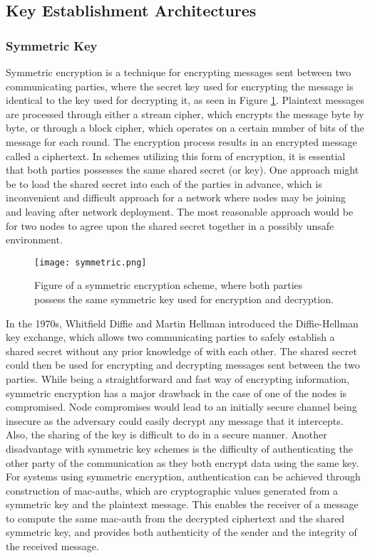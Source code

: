 \subsection{Key Establishment Architectures}

\subsubsection{Symmetric Key}

Symmetric encryption is a technique for encrypting messages sent between two communicating parties, where the secret key used for encrypting the message is identical to the key used for decrypting it, as seen in Figure \ref{fig:symmetric}. Plaintext messages are processed through either a stream cipher, which encrypts the message byte by byte, or through a block cipher, which operates on a certain number of bits of the message for each round. The encryption process results in an encrypted message called a ciphertext. In schemes utilizing this form of encryption, it is essential that both parties possesses the same shared secret (or key). One approach might be to load the shared secret into each of the parties in advance, which is inconvenient and difficult approach for a network where nodes may be joining and leaving after network deployment. The most reasonable approach would be for two nodes to agree upon the shared secret together in a possibly unsafe environment.

\begin{figure}[h]
	\centering
	\texttt{[image: symmetric.png]}
	\caption{Figure of a symmetric encryption scheme, where both parties possess the same symmetric key used for encryption and decryption.}
	\label{fig:symmetric}
\end{figure}

In the 1970s, Whitfield Diffie and Martin Hellman introduced the Diffie-Hellman key exchange, which allows two communicating parties to safely establish a shared secret without any prior knowledge of with each other\cite{diffie1976new}. The shared secret could then be used for encrypting and decrypting messages sent between the two parties.  While being a straightforward and fast way of encrypting information, symmetric encryption has a major drawback in the case of one of the nodes is compromised. Node compromises would lead to an initially secure channel being insecure as the adversary could easily decrypt any message that it intercepts. Also, the sharing of the key is difficult to do in a secure manner. Another disadvantage with symmetric key schemes is the difficulty of authenticating the other party of the communication as they both encrypt data using the same key. For systems using symmetric encryption, authentication can be achieved through construction of \gls{mac-auth}s, which are cryptographic values generated from a symmetric key and the plaintext message. This enables the receiver of a message to compute the same \gls{mac-auth} from the decrypted ciphertext and the shared symmetric key, and provides both authenticity of the sender and the integrity of the received message.


